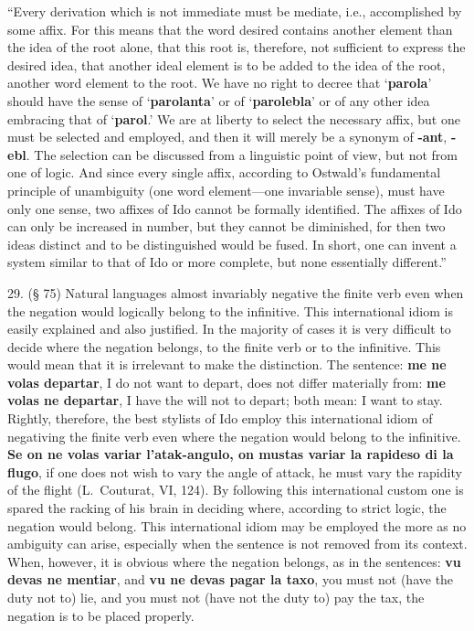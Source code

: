 ``Every derivation which is not immediate must be mediate, i.e., accomplished by some affix. For this means that the word desired contains another element than the idea of the root alone, that this root is, therefore, not sufficient to express the desired idea, that another ideal element is to be added to the idea of the root, another word element to the root. We have no right to decree that `\textbf{parola}' should have the sense of `\textbf{parolanta}' or of `\textbf{parolebla}' or of any other idea embracing that of `\textbf{parol}.' We are at liberty to select the necessary affix, but one must be selected and employed, and then it will merely be a synonym of \textbf{-ant}, \textbf{-ebl}. The selection can be discussed from a linguistic point of view, but not from one of logic. And since every single affix, according to Ostwald's fundamental principle of unambiguity (one word element—one invariable sense), must have only one sense, two affixes of Ido cannot be formally identified. The affixes of Ido can only be increased in number, but they cannot be diminished, for then two ideas distinct and to be distinguished would be fused. In short, one can invent a system similar to that of Ido or more complete, but none essentially different.''

29. (§ 75) Natural languages almost invariably negative the finite verb even when the negation would logically belong to the infinitive. This international idiom is easily explained and also justified. In the majority of cases it is very difficult to decide where the negation belongs, to the finite verb or to the infinitive. This would mean that it is irrelevant to make the distinction. The sentence: \textbf{me ne volas departar}, I do not want to depart, does not differ materially from: \textbf{me volas ne departar}, I have the will not to depart; both mean: I want to stay. Rightly, therefore, the best stylists of Ido employ this international idiom of negativing the finite verb even where the negation would belong to the infinitive. \textbf{Se on ne volas variar l'atak-angulo, on mustas variar la rapideso di la flugo}, if one does not wish to vary the angle of attack, he must vary the rapidity of the flight (L.~Couturat, VI, 124). By following this international custom one is spared the racking of his brain in deciding where, according to strict logic, the negation would belong. This international idiom may be employed the more as no ambiguity can arise, especially when the sentence is not removed from its context. When, however, it is obvious where the negation belongs, as in the sentences: \textbf{vu devas ne mentiar}, and \textbf{vu ne devas pagar la taxo}, you must not (have the duty not to) lie, and you must not (have not the duty to) pay the tax, the negation is to be placed properly. %

